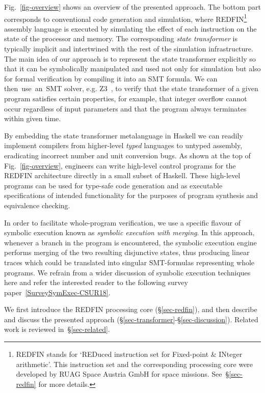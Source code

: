 Fig.~\ref{fig-overview} shows an overview of the presented approach. The bottom
part corresponds to conventional code generation and simulation, where
REDFIN\footnote{REDFIN stands for `REDuced instruction set for Fixed-point \&
INteger arithmetic'. This instruction set and the corresponding processing core
were developed by RUAG Space Austria GmbH for space missions.
See~\S\ref{sec-redfin} for more details.} assembly language is executed by
simulating the effect of each instruction on the state of the processor and memory.
The corresponding \emph{state transformer} is typically implicit and intertwined
with the rest of the simulation infrastructure. The main idea of our approach is
to represent the state transformer explicitly so that it can be symbolically
manipulated and used not only for simulation but also for formal verification by
compiling it into an SMT formula. We can then~use~an~SMT solver, e.g.
Z3~\cite{de2008z3}, to verify that the state transformer of a given program
satisfies certain properties, for example, that integer overflow cannot occur
regardless of input parameters and that the program always terminates within
given time.

By embedding the state transformer metalanguage in Haskell we can readily
implement compilers from higher-level \emph{typed} languages to untyped assembly,
eradicating incorrect number and unit conversion bugs. As shown at the top of
Fig.~\ref{fig-overview}, engineers can write high-level control
programs for the REDFIN architecture directly in a small subset of Haskell. These
high-level programs can be used for type-safe code generation and as executable
specifications of intended functionality for the purposes of program synthesis and
equivalence checking.

In order to facilitate whole-program verification, we use a specific flavour of
symbolic execution known as \emph{symbolic execution with merging}. In this approach,
whenever a branch in the program is encountered, the symbolic execution engine performs
merging of the two resulting disjunctive states, thus producing linear traces which could
be translated into singular SMT-formulas representing whole programs. We refrain from a
wider discussion of symbolic execution techniques here and refer the interested reader to
the following survey paper~\ref{SurveySymExec-CSUR18}.

We first introduce the REDFIN processing core (\S\ref{sec-redfin}), and then
describe and discuss the presented approach
(\S\ref{sec-transformer}-\S\ref{sec-discussion}). Related work is reviewed
in~\S\ref{sec-related}.
